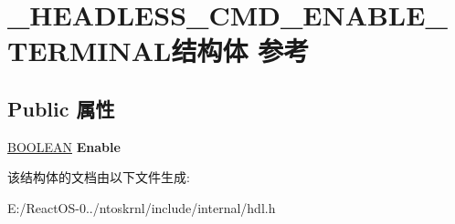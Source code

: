 \hypertarget{struct___h_e_a_d_l_e_s_s___c_m_d___e_n_a_b_l_e___t_e_r_m_i_n_a_l}{}\section{\+\_\+\+H\+E\+A\+D\+L\+E\+S\+S\+\_\+\+C\+M\+D\+\_\+\+E\+N\+A\+B\+L\+E\+\_\+\+T\+E\+R\+M\+I\+N\+A\+L结构体 参考}
\label{struct___h_e_a_d_l_e_s_s___c_m_d___e_n_a_b_l_e___t_e_r_m_i_n_a_l}
\subsection*{Public 属性}
\begin{DoxyCompactItemize}
\item 
\mbox{\label{struct___h_e_a_d_l_e_s_s___c_m_d___e_n_a_b_l_e___t_e_r_m_i_n_a_l_a162b70c5969f69d158ea41ffc2da87eb}} 
\hyperlink{_processor_bind_8h_a112e3146cb38b6ee95e64d85842e380a}{B\+O\+O\+L\+E\+AN} {\bfseries Enable}
\end{DoxyCompactItemize}


该结构体的文档由以下文件生成\+:\begin{DoxyCompactItemize}
\item 
E\+:/\+React\+O\+S-\/0../ntoskrnl/include/internal/hdl.\+h\end{DoxyCompactItemize}
